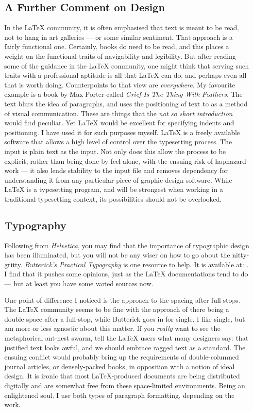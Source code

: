 \documentclass[11pt, oneside]{memoir}
\begin{document}
\subsection*{A Further Comment on Design}
In the \LaTeX{} community, it is often emphasised that text is meant to be read, not to hang in art galleries — or some similar sentiment. That approach is a fairly functional one. Certainly, books do need to be read, and this places a weight on the functional traits of navigability and 
legibility. But after reading some of the guidance in the \LaTeX{} community, one might think that serving such traits with a professional aptitude is all that \LaTeX{} can do, and perhaps even all that is worth doing. Counterpoints to that view are \emph{everywhere}. My favourite example is a book by Max Porter called \emph{Grief Is The Thing With Feathers}. The text blurs the idea of paragraphs, and uses the positioning of text to as a method of visual communication. These are things that the \emph{not so short introduction} would find peculiar. Yet \LaTeX{} would be excellent for specifying indents and positioning. I have used it for such purposes myself. \LaTeX{} is a freely available software that allows a high level of control over the typesetting process. The input is plain text as the input. Not only does this allow the process to be explicit, rather than being done by feel alone, with the ensuing risk of haphazard work — it also lends stability to the input file and removes dependency for understanding it from any particular piece of graphic-design software. While \LaTeX{} is a typesetting program, and will be strongest when working in a traditional typesetting context, its possibilities should not be overlooked.

\subsection{Typography}
Following from \emph{Helvetica}, you may find that the importance of typographic design has been illuminated, but you will not be any wiser on how to go about the nitty-gritty. \emph{Butterick's Practical Typography} is one resource to help. It is available at: . I find that it pushes some opinions, just as the \LaTeX{} documentations tend to do — but at least you have some varied sources now. 

One point of difference I noticed is the approach to the spacing after full stops. The \LaTeX{} community seems to be fine with the approach of there being a double space after a full-stop, while Butterick goes in for single. I like single, but am more or less agnostic about this matter. If you \emph{really} want to see the metaphorical ant-nest swarm, tell the \LaTeX{} users what many designers say: that justified text looks awful, and we should embrace ragged text as a standard. The ensuing conflict would probably bring up the requirements of double-columned journal articles, or densely-packed books, in opposition with a notion of ideal design. It is ironic that most \LaTeX{}-produced documents are being distributed digitally and are somewhat free from these space-limited environments. Being an enlightened soul, I use both types of paragraph formatting, depending on the work.
\end{document}
